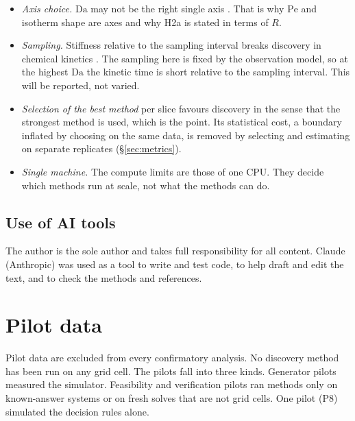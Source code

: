 \documentclass[11pt]{article}
\newcommand{\Da}{\mathrm{Da}}
\newcommand{\Pe}{\mathrm{Pe}}
\begin{document}
\begin{itemize}
for identifiability \citep{wang2022pyomo} is outside this study.
\item \emph{Axis choice.} $\Da$ may not be the right single axis \citep{hansen2017,
miyabe2000}. That is why $\Pe$ and isotherm shape are axes and why H2a is stated in terms
of $R$.
\item \emph{Sampling.} Stiffness relative to the sampling interval breaks discovery in
chemical kinetics \citep{prabhu2025}. The sampling here is fixed by the observation model,
so at the highest $\Da$ the kinetic time is short relative to the sampling interval. This
will be reported, not varied.
\item \emph{Selection of the best method} per slice favours discovery in the sense that the
strongest method is used, which is the point. Its statistical cost, a boundary inflated by
choosing on the same data, is removed by selecting and estimating on separate replicates
(\S\ref{sec:metrics}).
\item \emph{Single machine.} The compute limits are those of one CPU. They decide which
methods run at scale, not what the methods can do.
\end{itemize}

\subsection{Use of AI tools}
\label{sec:ai}
The author is the sole author and takes full responsibility for all content. Claude
(Anthropic) was used as a tool to write and test code, to help draft and edit the text, and
to check the methods and references.

\section{Pilot data}
\label{sec:pilots}
Pilot data are excluded from every confirmatory analysis. No discovery method has been run
on any grid cell. The pilots fall into three kinds. Generator pilots measured the simulator.
Feasibility and verification pilots ran methods only on known-answer systems or on fresh
solves that are not grid cells. One pilot (P8) simulated the decision rules alone.
\end{document}

